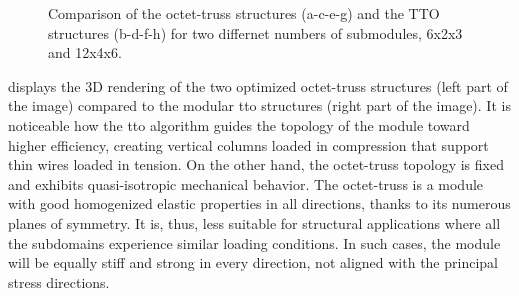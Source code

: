 \begin{figure}
    \hfill
    \hspace*{\fill}
    \bigskip
    \hspace*{\fill}
    \hfill
    \hspace*{\fill}
    \caption{Comparison of the octet-truss structures (a-c-e-g) and the TTO structures (b-d-f-h) for two differnet numbers of submodules, 6x2x3 and 12x4x6.}
    \label{fig:05_octet_results}
\end{figure}

 displays the 3D rendering of the two optimized octet-truss structures (left part of the image) compared to the modular \gls{tto} structures (right part of the image). It is noticeable how the \gls{tto} algorithm guides the topology of the module toward higher efficiency, creating vertical columns loaded in compression that support thin wires loaded in tension. On the other hand, the octet-truss topology is fixed and exhibits quasi-isotropic mechanical behavior. The octet-truss is a module with good homogenized elastic properties in all directions, thanks to its numerous planes of symmetry. It is, thus, less suitable for structural applications where all the subdomains experience similar loading conditions. In such cases, the module will be equally stiff and strong in every direction, not aligned with the principal stress directions.


